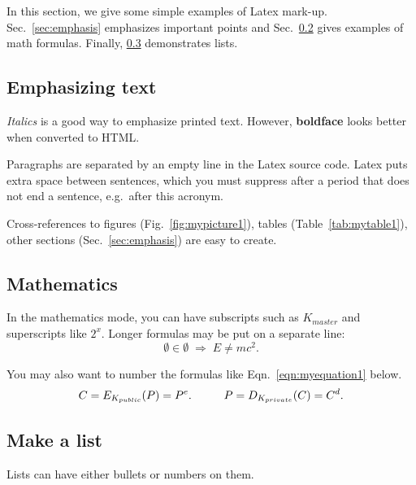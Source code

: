 \documentclass[a4paper,12pt]{article}
\begin{document}
In this section, we give some simple examples of Latex mark-up.
Sec.~\ref{sec:emphasis} emphasizes important points and
Sec.~\ref{sec:math} gives examples of math formulas.
Finally, \ref{sec:list} demonstrates lists.




\subsection{Emphasizing text}\label{sec:Emphasizing text}

\textit{Italics} is a good way to emphasize printed text. However,
\textbf{boldface} looks better when converted to HTML.

Paragraphs are separated by an empty line in the Latex source code.
Latex puts extra space between sentences, which you must suppress
after a period that does not end a sentence, e.g.\ after this acronym.

Cross-references to figures (Fig.~\ref{fig:mypicture1}), tables
(Table~\ref{tab:mytable1}), other sections (Sec.~\ref{sec:emphasis})
are easy to create. 




\subsection{Mathematics}\label{sec:math}

In the mathematics mode, you can have subscripts such as $K_{master}$
and superscripts like $2^x$. Longer formulas may be put on a separate
line:
\[ \emptyset \in \emptyset \; \Rightarrow \; E \neq mc^2. \]

You may also want to number the formulas like Eqn.~\ref{eqn:myequation1}
below.
\begin{equation}\label{eqn:myequation1}
C = E_{K_{public}}(P) = P^e. \hspace{10mm}   P = D_{K_{private}}(C) = C^d.
\end{equation}





\subsection{Make a list}\label{sec:list}

Lists can have either bullets or numbers on them. 
\end{document}
